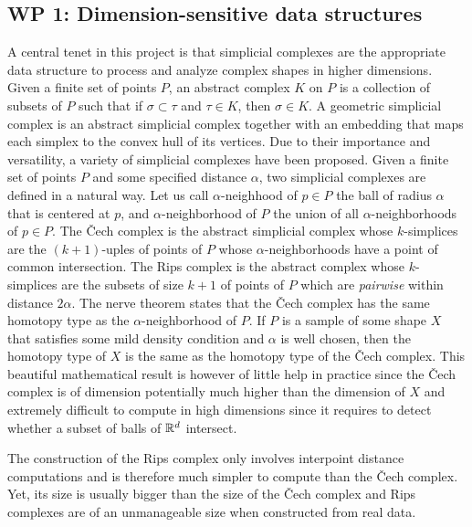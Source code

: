 \subsection*{WP 1:  Dimension-sensitive data structures} 

A central tenet in this project is that simplicial complexes are the appropriate data structure
to process and analyze complex shapes in higher dimensions. Given a finite set of points $P$, an abstract complex $K$ on $P$ is a collection of subsets of $P$ such that 
if $\sigma\subset \tau$ and $\tau\in K$, then $\sigma \in K$.
A geometric simplicial complex is an abstract simplicial complex together with an embedding that maps each simplex to the convex hull of its vertices. %
Due to their importance and versatility, a variety of simplicial complexes have been proposed.  Given a finite set of points $P$ and some specified distance $\alpha$, two simplicial complexes are defined in a natural way. Let us call $\alpha$-neighhood of $p\in P$ the ball of radius $\alpha$ that is centered at $p$, and $\alpha$-neighborhood of $P$ the union of all $\alpha$-neighborhoods of $p\in P$.  The \v{C}ech complex is the abstract simplicial complex whose $k$-simplices are the $(k+1)$-uples of points of $P$ whose $\alpha$-neighborhoods have a point of common intersection.  The Rips complex is the abstract complex whose $k$-simplices are the subsets of size $k+1$ of points of $P$ which are {\em pairwise} within distance $2\alpha$. The nerve theorem states that the \v{C}ech complex has the same homotopy type as the $\alpha$-neighborhood of $P$. If $P$ is a sample of some shape $X$ that satisfies some mild density condition and $\alpha$ is well chosen, then the homotopy type of $X$ is the same as the homotopy type of the \v{C}ech complex. This beautiful mathematical result is however of little help in practice since the \v{C}ech complex is of dimension potentially much higher than the dimension of $X$ and extremely difficult to compute in high dimensions since it requires to detect whether a subset of balls of $\mathbb R ^d$ intersect. 

The construction of the Rips complex only involves interpoint distance computations and is therefore much  simpler to compute than the \v{C}ech complex. Yet, its size is usually bigger than the size of the \v{C}ech complex and Rips complexes are of an unmanageable size when constructed from real data. 

